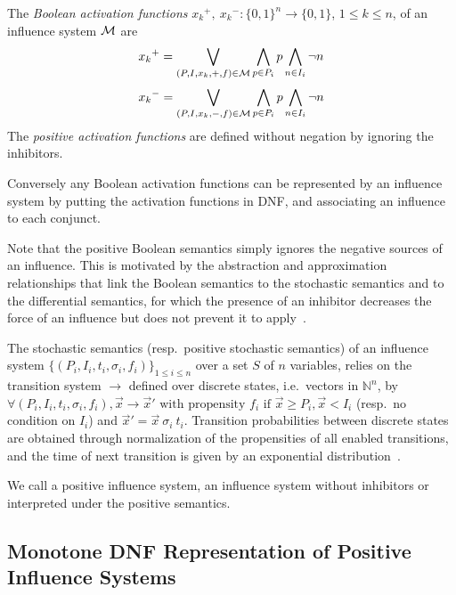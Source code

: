 \documentclass{llncs}
\newcommand{\lra}{\longrightarrow}
\begin{document}
\begin{definition}\label{def:activation}
The \emph{Boolean activation functions} ${x_k}^+,\ {x_k}^-:{\{0,1\}}^n \rightarrow\{0,1\}$, $1 \leq k \leq n$,
of an influence system $\cal M$ are
$${x_k}^+=\bigvee_{(P,I,x_k,+,f)\in\cal M} \bigwedge_{p\in P_i} p\bigwedge_{n\in I_i} \neg n$$
$${x_k}^-=\bigvee_{(P,I,x_k,-,f)\in\cal M} \bigwedge_{p\in P_i} p\bigwedge_{n\in I_i} \neg n$$
The \emph{positive activation functions} are defined without negation by ignoring the inhibitors.
\end{definition}

Conversely any Boolean activation functions can be represented by an influence system
by putting the activation functions in DNF, and associating an influence to each conjunct.

Note that the positive Boolean semantics simply ignores the negative sources of an influence.
This is motivated by the abstraction and approximation relationships that link the Boolean semantics
to the stochastic semantics and to the differential semantics, for which the presence of an inhibitor decreases the force of an influence but does not prevent it to apply~\cite{FMRS16cmsb}.


\begin{definition}\label{def:stoch}
   The stochastic semantics (resp.~positive stochastic semantics) of an influence system $\{(P_i, I_i, t_i,
   \sigma_i, f_i)\}_{1\leq i\leq n}$ over a set $S$ of $n$ variables, relies
   on the transition system $\lra$ defined over discrete states, i.e.\
   vectors in $\mathbb{N}^n$, by $\forall (P_i, I_i, t_i, \sigma_i, f_i), {\vec
   x}\lra{\vec x'} \text{ with propensity }f_i\text{ if }{\vec x}\geq P_i,
   {\vec x}<I_i$ (resp.~no condition on $I_i$) and ${\vec x'} = {\vec x}\  \sigma_i\ t_i$.
   Transition probabilities between discrete states are obtained through
   normalization of the propensities of all enabled transitions, and the time
   of next transition is given by an exponential distribution~\cite{Gillespie77jpc}.
\end{definition}

We call a positive influence system, an influence system without inhibitors or interpreted under the positive semantics.

\subsection{Monotone DNF Representation of Positive Influence Systems}
\end{document}
